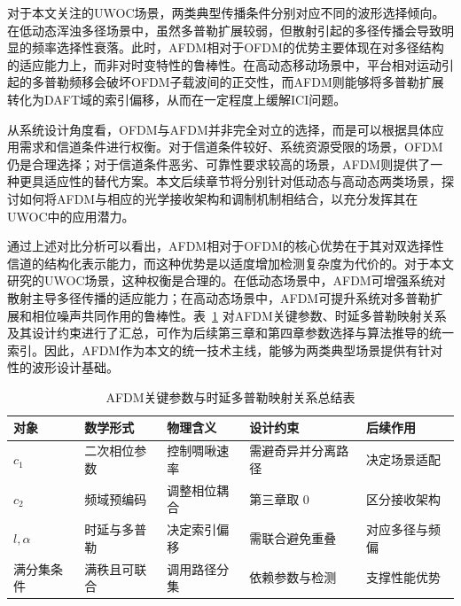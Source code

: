 对于本文关注的UWOC场景，两类典型传播条件分别对应不同的波形选择倾向。在低动态浑浊多径场景中，虽然多普勒扩展较弱，但散射引起的多径传播会导致明显的频率选择性衰落。此时，AFDM相对于OFDM的优势主要体现在对多径结构的适应能力上，而非对时变特性的鲁棒性。在高动态移动场景中，平台相对运动引起的多普勒频移会破坏OFDM子载波间的正交性，而AFDM则能够将多普勒扩展转化为DAFT域的索引偏移，从而在一定程度上缓解ICI问题。

从系统设计角度看，OFDM与AFDM并非完全对立的选择，而是可以根据具体应用需求和信道条件进行权衡。对于信道条件较好、系统资源受限的场景，OFDM仍是合理选择；对于信道条件恶劣、可靠性要求较高的场景，AFDM则提供了一种更具适应性的替代方案。本文后续章节将分别针对低动态与高动态两类场景，探讨如何将AFDM与相应的光学接收架构和调制机制相结合，以充分发挥其在UWOC中的应用潜力。

通过上述对比分析可以看出，AFDM相对于OFDM的核心优势在于其对双选择性信道的结构化表示能力，而这种优势是以适度增加检测复杂度为代价的。对于本文研究的UWOC场景，这种权衡是合理的。在低动态场景中，AFDM可增强系统对散射主导多径传播的适应能力；在高动态场景中，AFDM可提升系统对多普勒扩展和相位噪声共同作用的鲁棒性。表~\ref{tab:afdm_parameter_summary} 对AFDM关键参数、时延多普勒映射关系及其设计约束进行了汇总，可作为后续第三章和第四章参数选择与算法推导的统一索引。因此，AFDM作为本文的统一技术主线，能够为两类典型场景提供有针对性的波形设计基础。

\begin{table}[htbp]
    \centering
    \caption{AFDM关键参数与时延多普勒映射关系总结表}
    \label{tab:afdm_parameter_summary}
    \footnotesize
    \setlength{\tabcolsep}{4pt}
    \begin{tabular}{p{1.6cm}p{2.2cm}p{2.0cm}p{2.2cm}p{2.6cm}}
        \toprule
        对象 & 数学形式 & 物理含义 & 设计约束 & 后续作用 \\
        \midrule
        $c_1$ & 二次相位参数 & 控制啁啾速率 & 需避奇异并分离路径 & 决定场景适配 \\
        $c_2$ & 频域预编码 & 调整相位耦合 & 第三章取 $0$ & 区分接收架构 \\
        $l,\alpha$ & 时延与多普勒 & 决定索引偏移 & 需联合避免重叠 & 对应多径与频偏 \\
        满分集条件 & 满秩且可联合 & 调用路径分集 & 依赖参数与检测 & 支撑性能优势 \\
        \bottomrule
    \end{tabular}
\end{table}

